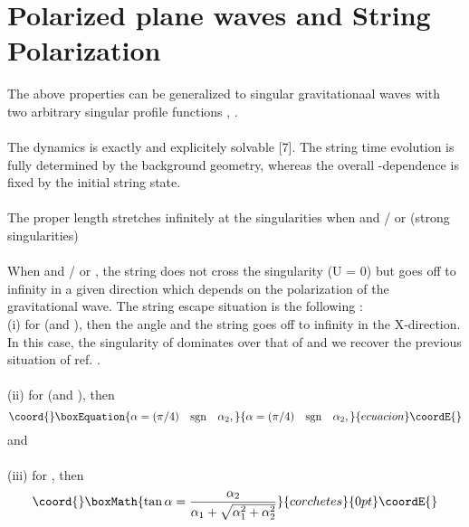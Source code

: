 \documentclass[12pt,a4paper]{article}
\begin{document}
\section{Polarized plane waves and String Polarization}
The above properties can be generalized to singular gravitationaal waves 
with two arbitrary singular profile functions \coordHE{}, 
\coordHE{}. \\ \\
The dynamics is exactly and explicitely solvable [7]. The string time 
evolution is fully determined by the background geometry, whereas the overall \myHighlight{$\sigma $}\coordHE{}-dependence is fixed by the initial string state. \\ \\
The proper length stretches infinitely at the singularities when 
\coordHE{} and / or \coordHE{} (strong singularities)\\ \\
When \coordHE{} and / or \coordHE{}, the string does not cross 
the singularity (U = 0) but goes off to infinity in a given direction 
\myHighlight{$\alpha $}\coordHE{} which depends on the polarization of the gravitational wave. The 
string escape situation is the following : \\
(i) for \coordHE{} (and \coordHE{}), then the angle 
\coordHE{} and the string goes off to infinity in the X-direction. In this 
case, the singularity of \coordHE{} dominates over that of \coordHE{} and we recover 
the previous situation of ref. \cite{vs1}.\\ \\
(ii) for \coordHE{} (and \coordHE{}), then 
\begin{equation}\coord{}\boxEquation{
\alpha = (\pi/4)\quad \mathrm{sgn} \quad \alpha _2,
}{
\alpha = (\pi/4)\quad \mathrm{sgn} \quad \alpha _2,
}{ecuacion}\coordE{}\end{equation}
and \\ \\
(iii) for \coordHE{}, then 
\begin{displaymath}\coord{}\boxMath{
\tan \alpha = \frac{\alpha _2}{\alpha _1 + \sqrt{\alpha ^2_1 + \alpha ^2_2}}
}{corchetes}{0pt}\coordE{}\end{displaymath}
\end{document}
